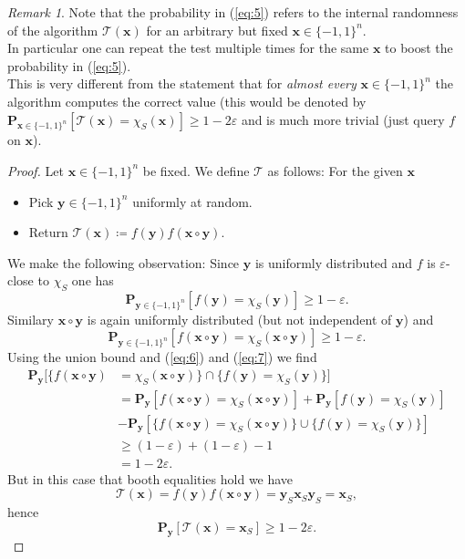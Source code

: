 \documentclass[a4paper]{article}
\newcommand{\prob}{\mathbf{P}}
\newcommand{\eps}{\varepsilon}
\newcommand{\boldx}{\boldsymbol{x}}
\newcommand{\boldy}{\boldsymbol{y}}
\theoremstyle{plain}
\theoremstyle{definition}
\theoremstyle{remark}
\newtheorem*{remark*}{Remark}
\begin{document}
\begin{remark*}
Note that the probability in (\ref{eq:5}) refers to the internal
randomness of the algorithm \(\mathcal{T}(\boldx)\) for an arbitrary but
fixed \(\boldx \in \{-1,1\}^n\).\\
In particular one can repeat the test multiple times for the same
\(\boldx\) to boost the probability in (\ref{eq:5}). \\ 
This is very different from the statement that for \emph{almost
  every} \(\boldx \in \{-1,1\}^n\) the algorithm computes the correct
value (this would be denoted by  \(\prob_{\boldx \in
  \{-1,1\}^n}[\mathcal{T}(\boldx) = \chi_S(\boldx)] \geq 1 -2\eps \)
and is much more trivial (just query \(f\) on \(\boldx\)).\\
\end{remark*}

\begin{proof}
  Let \(\boldx\in \{-1,1\}^n\) be fixed. We define \(\mathcal{T}\) as
  follows: For the given \(\boldx\)
  \begin{itemize}
  \item Pick \(\boldy\in\{-1,1\}^n\) uniformly at random.
  \item Return \(\mathcal{T}(\boldx) \coloneqq f(\boldy)f(\boldx\circ \boldy)\). 
  \end{itemize}
  We make the following observation: Since \(\boldy\) is uniformly
  distributed and \(f\) is \(\eps\)-close to \(\chi_S\) one has
  \begin{equation}
    \label{eq:6}
    \prob_{\boldy\in\{-1,1\}^n}[f(\boldy) = \chi_S(\boldy)] \geq 1 - \eps. 
  \end{equation}
  Similary \(\boldx\circ \boldy\) is again uniformly distributed (but not
  independent of \(\boldy\)) and 
  \begin{equation}
    \label{eq:7}
    \prob_{\boldy\in\{-1,1\}^n}[f(\boldx\circ \boldy) = \chi_S(\boldx\circ \boldy)] \geq 1 - \eps. 
  \end{equation}
  Using the union bound and (\ref{eq:6}) and (\ref{eq:7}) we find 
  \begin{align}
    \label{eq:8}
    \prob_{\boldy}[\{f(\boldx\circ \boldy) &= \chi_S(\boldx\circ \boldy)\} \cap \{f(\boldy) = \chi_S(\boldy)\}] \\
    &= \prob_{\boldy}[f(\boldx\circ \boldy) = \chi_S(\boldx\circ \boldy)] + \prob_{\boldy}[f(\boldy) = \chi_S(\boldy)] \\ 
    &- \prob_{\boldy}[\{f(\boldx\circ \boldy) = \chi_S(\boldx\circ \boldy)\} \cup \{f(\boldy) = \chi_S(\boldy)\}] \\
    &\geq (1-\eps) + (1-\eps) - 1 \\
    &= 1-2\eps. 
  \end{align}
  But in this case that booth equalities hold we have 
  \[\mathcal{T}(\boldx) = f(\boldy)f(\boldx\circ \boldy) = \boldy_S\boldx_S\boldy_S = \boldx_S,\] 
  hence 
  \[\prob_{\boldy}[\mathcal{T}(\boldx) = \boldx_S] \geq 1 - 2\eps.\]
  \end{proof}
\end{document}
